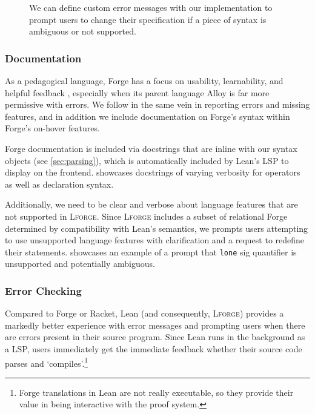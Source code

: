 \begin{figure}
  \centering
  \caption{We can define custom error messages with our implementation to prompt users to change their specification if a piece of syntax is ambiguous or not supported.}
  \label{fig:sc-unsupported}
\end{figure}


\subsubsection{Documentation}

As a pedagogical language, Forge has a focus on usability, learnability, and helpful feedback \cite{ngpdbccdlrrvwwk-oopsla-2024}, especially when its parent language Alloy is far more permissive with errors. We follow in the same vein in reporting errors and missing features, and in addition we include documentation on Forge's syntax within Forge's on-hover features. 

Forge documentation is included via docstrings that are inline with our syntax objects (see \cref{sec:parsing}), which is automatically included by Lean's LSP to display on the frontend.  showcases docstrings of varying verbosity for operators as well as declaration syntax. 

Additionally, we need to be clear and verbose about language features that are not supported in \textsc{Lforge}. Since \textsc{Lforge} includes a subset of relational Forge determined by compatibility with Lean's semantics, we prompts users attempting to use unsupported language features with clarification and a request to redefine their statements.  showcases an example of a prompt that \texttt{lone} sig quantifier is unsupported and potentially ambiguous. 

\subsubsection{Error Checking}

Compared to Forge or Racket, Lean (and consequently, \textsc{Lforge}) provides a markedly better experience with error messages and prompting users when there are errors present in their source program. Since Lean runs in the background as a LSP, users immediately get the immediate feedback whether their source code parses and `compiles'.\footnote{Forge translations in Lean are not really executable, so they provide their value in being interactive with the proof system.}


